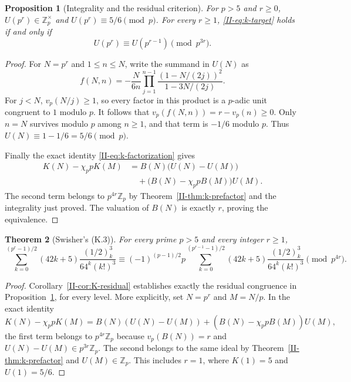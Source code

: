 \documentclass[11pt,letterpaper]{article}
\newtheorem{theorem}{Theorem}[section]
\newtheorem{proposition}[theorem]{Proposition}
\numberwithin{equation}{section}
\begin{document}
\begin{proposition}[Integrality and the residual criterion]
\label{II-prop:k-equivalence}
For $p>5$ and $r\ge0$, $U(p^r)\in\mathbb Z_p^\times$ and
$U(p^r)\equiv5/6\pmod p$. For every $r\ge1$, \eqref{II-eq:k-target}
holds if and only if
\begin{equation}\label{II-eq:k-residual-congruence}
 \boxed{\quad U(p^r)\equiv U(p^{r-1})\pmod{p^{3r}}.\quad}
\end{equation}
\end{proposition}
\begin{proof}
For $N=p^r$ and $1\le n\le N$, write the summand in $U(N)$ as
\begin{equation}\label{II-eq:k-summand-product}
 f(N,n)=-\frac{N}{6n}
 \prod_{j=1}^{n-1}
 \frac{(1-N/(2j))^2}{1-3N/(2j)}.
\end{equation}
For $j<N$, $v_p(N/j)\ge1$, so every factor in this product is a
$p$-adic unit congruent to $1$ modulo $p$. It follows that
$v_p(f(N,n))=r-v_p(n)\ge0$. Only $n=N$ survives modulo $p$ among
$n\ge1$, and that term is $-1/6$ modulo $p$. Thus
$U(N)\equiv1-1/6=5/6\pmod p$.

Finally the exact identity \eqref{II-eq:k-factorization} gives
\begin{align*}
 K(N)-\chi_p pK(M)
 &=B(N)\bigl(U(N)-U(M)\bigr)\\
 &\quad+\bigl(B(N)-\chi_p pB(M)\bigr)U(M).
\end{align*}
The second term belongs to $p^{4r}\mathbb Z_p$ by
Theorem~\ref{II-thm:k-prefactor} and the integrality just proved.
The valuation of $B(N)$ is exactly $r$, proving the equivalence.
\end{proof}

\begin{theorem}[Swisher's (K.3)]\label{II-thm:K-complete}
For every prime $p>5$ and every integer $r\ge1$,
\[
\boxed{\displaystyle
\sum_{k=0}^{(p^r-1)/2}(42k+5)\frac{(1/2)_k^3}{64^k(k!)^3}
\equiv (-1)^{(p-1)/2}p
\sum_{k=0}^{(p^{r-1}-1)/2}(42k+5)\frac{(1/2)_k^3}{64^k(k!)^3}
\pmod{p^{4r}}.}
\]
\end{theorem}
\begin{proof}
Corollary~\ref{II-cor:K-residual} establishes exactly the residual
congruence in Proposition~\ref{II-prop:k-equivalence}, for every level.
More explicitly, set $N=p^r$ and $M=N/p$. In the exact identity
\[
K(N)-\chi_p pK(M)
=B(N)(U(N)-U(M))+(B(N)-\chi_p pB(M))U(M),
\]
the first term belongs to $p^{4r}\mathbb Z_p$ because
$v_p(B(N))=r$ and $U(N)-U(M)\in p^{3r}\mathbb Z_p$.
The second belongs to the same ideal by
Theorem~\ref{II-thm:k-prefactor} and $U(M)\in\mathbb Z_p$.
This includes $r=1$, where $K(1)=5$ and $U(1)=5/6$.
\end{proof}
\end{document}
